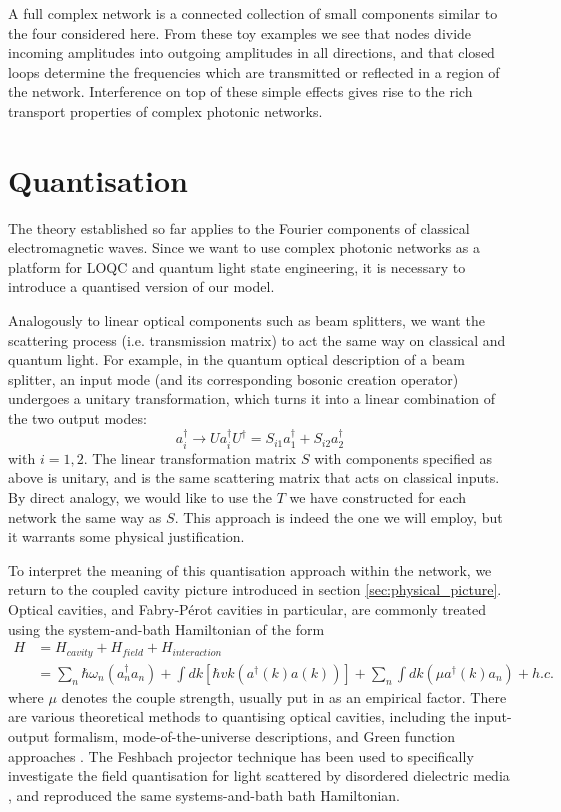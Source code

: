 A full complex network is a connected collection of small components similar to the four considered here. From these toy examples we see that nodes divide incoming amplitudes into outgoing amplitudes in all directions, and that closed loops determine the frequencies which are transmitted or reflected in a region of the network. Interference on top of these simple effects gives rise to the rich transport properties of complex photonic networks.  


\section{Quantisation}
The theory established so far applies to the Fourier components of classical electromagnetic waves. Since we want to use complex photonic networks as a platform for LOQC and quantum light state engineering, it is necessary to introduce a quantised version of our model.

Analogously to linear optical components such as beam splitters, we want the scattering process (i.e. transmission matrix) to act the same way on classical and quantum light. For example, in the quantum optical description of a beam splitter, an input mode (and its corresponding bosonic creation operator) undergoes a unitary transformation, which turns it into a linear combination of the two output modes:
\begin{equation}
    \label{eq:beamsplitter}
    a_i^\dagger \rightarrow Ua_i^\dagger U^\dagger = S_{i1}a_1^\dagger + S_{i2}a_2^\dagger
\end{equation}
with $i=1,2$. The linear transformation matrix $S$ with components specified as above is unitary, and is the same scattering matrix that acts on classical inputs. By direct analogy, we would like to use the $T$ we have constructed for each network the same way as $S$. This approach is indeed the one we will employ, but it warrants some physical justification.

To interpret the meaning of this quantisation approach within the network, we return to the coupled cavity picture introduced in section \ref{sec:physical_picture}. Optical cavities, and Fabry-P\'erot cavities in particular, are commonly treated using the system-and-bath Hamiltonian of the form \cite{Zandi2012}
\begin{align}
\label{eq:H_fabryperot}
        H &= H_{cavity} + H_{field} + H_{interaction}\\ \nonumber
          &= \sum_n \hbar\omega_n(a_n^\dagger a_n) + \int dk [\hbar vk  (a^\dagger(k)a(k))] + \sum_n\int dk (\mu a^\dagger(k)a_n) + h.c.
\end{align}
where $\mu$ denotes the couple strength, usually put in as an empirical factor. There are various theoretical methods to quantising optical cavities, including the input-output formalism, mode-of-the-universe descriptions, and Green function approaches \cite{Barlow2015}. The Feshbach projector technique has been used to specifically investigate the field quantisation for light scattered by disordered dielectric media \cite{Viviescas2003}, and reproduced the same systems-and-bath bath Hamiltonian. 

